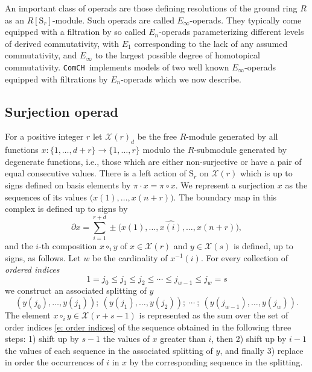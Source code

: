 \documentclass{amsart}
\renewcommand{\S}{\mathrm S}
\newcommand{\comch}{\texttt{ComCH}}
\newcommand{\X}{\mathcal X}
\begin{document}
An important class of operads are those defining resolutions of the ground ring $R$ as an $R[\S_r]$-module. Such operads are called \mbox{$E_\infty$-operads}. They typically come equipped with a filtration by so called $E_n$-operads parameterizing different levels of derived commutativity, with $E_1$ corresponding to the lack of any assumed commutativity, and $E_\infty$ to the largest possible degree of homotopical commutativity. \comch\, implements models of two well known $E_\infty$-operads equipped with filtrations by $E_n$-operads which we now describe.

\subsection{Surjection operad}

For a positive integer $r$ let $\mathcal X(r)_d$ be the free $R$-module generated by all functions $x : \{1, \dots, d+r\} \to \{1, \dots, r\}$ modulo the $R$-submodule generated by degenerate functions, i.e., those which are either non-surjective or have a pair of equal consecutive values. There is a left action of $\mathrm S_r$ on $\mathcal X(r)$ which is up to signs defined on basis elements by $\pi \cdot x = \pi \circ x$.
We represent a surjection $x$ as the sequences of its values $\big( x(1), \dots, x(n+r) \big)$. The boundary map in this complex is defined up to signs by
\begin{equation*}
\partial x = \sum_{i = 1}^{r+d} \pm \big( x(1), \dots, \widehat{x(i)}, \dots, x(n+r) \big),
\end{equation*}
and the $i$-th composition $x \circ_i y$ of $x \in \mathcal X(r)$ and $y \in \mathcal X(s)$ is defined, up to signs, as follows. Let $w$ be the cardinality of $x^{-1}(i)$. For every collection of \textit{ordered indices}
\begin{equation} \label{e: order indices}
1 = j_0 \leq j_1 \leq j_2 \leq \cdots \leq j_{w-1} \leq j_w = s
\end{equation}
we construct an associated splitting of $y$
\begin{equation*}
(y(j_0), \dots, y(j_1));\ (y(j_1), \dots, y(j_2));\ \cdots \ ;\ (y(j_{w-1}), \dots, y(j_w)).
\end{equation*}
The element $x \circ_i y \in \X(r+s-1)$ is represented as the sum over the set of order indices \eqref{e: order indices} of the sequence obtained in the following three steps: 1) shift up by $s-1$ the values of $x$ greater than $i$, then 2) shift up by $i-1$ the values of each sequence in the associated splitting of $y$, and finally 3) replace in order the occurrences of $i$ in $x$ by the corresponding sequence in the splitting.
\end{document}
